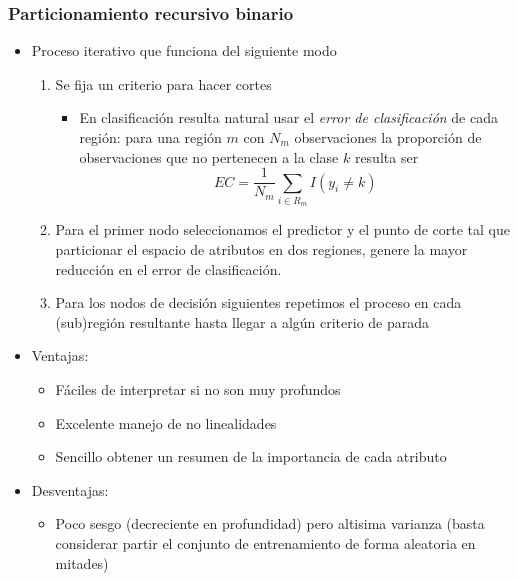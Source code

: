 \documentclass[leqno, 10pt, envcountsect]{beamer}
\numberwithin{equation}{section}
\theoremstyle{definition}
\theoremstyle{example}
\numberwithin{figure}{section}
\numberwithin{table}{section}
\let\olditem\item
\renewcommand{\item}{%
\olditem\vspace{1pt}}
\begin{document}
\begin{frame}[fragile=singleslide]
  \frametitle{Particionamiento recursivo binario}
  \begin{itemize}
    \item Proceso iterativo que funciona del siguiente modo
      \begin{enumerate}
        \item Se fija un criterio para hacer cortes
          \begin{itemize}
            \item En clasificación resulta natural
usar el \textit{error de clasificación} de cada región: para una región $m$ con $N_{m}$ observaciones la proporción de observaciones
que no pertenecen a la clase $k$ resulta ser
\begin{equation*}
  EC = \frac{1}{N_{m}}\sum_{i\in R_{m}}I(y_{i} \not = k)
\end{equation*}
          \end{itemize}
      \item Para el primer nodo seleccionamos el predictor y el punto de corte
        tal que particionar el espacio de atributos en dos regiones, genere la
          mayor reducción en el error de clasificación.
      \item Para los nodos de decisión
siguientes repetimos el proceso en cada (sub)región resultante hasta llegar a algún criterio de parada
      \end{enumerate}
  \item Ventajas:
    \begin{itemize}
      \item Fáciles de interpretar si no son muy profundos
      \item Excelente manejo de no linealidades
      \item Sencillo obtener un resumen de la importancia de cada atributo
    \end{itemize}
  \item Desventajas:
    \begin{itemize}
      \item  Poco sesgo (decreciente en profundidad) pero altisima varianza (basta considerar partir el
        conjunto de entrenamiento de forma aleatoria en mitades)
    \end{itemize}
  \end{itemize}
\end{frame}
\end{document}

